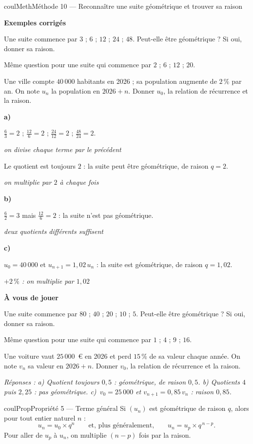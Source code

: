 \documentclass[11pt,a4paper]{article}
\makeatletter
\newcounter{lycee@signet}
\newcommand{\signet}[3][]{\stepcounter{lycee@signet}%
  \edef\lycee@dest{\if\relax\detokenize{#1}\relax
    signet.\arabic{lycee@signet}\else#1\fi}%
  \hypertarget{\lycee@dest}{}\bookmark[level=#2,dest=\lycee@dest]{#3}}
\newcommand{\res}[1]{#1}
\newcounter{methode}
\newenvironment{proprietebox}[1][Propriété]%
  {\begin{boitecours}[phantom={\signet{2}{#1}}]{coulProp}{#1}}{\end{boitecours}}
\newenvironment{methodebox}[1][Méthode]{\stepcounter{methode}%
  \begin{boitecours}[phantom={\signet[methode-\arabic{methode}]{2}{#1}}]{coulMeth}{#1}}%
  {\end{boitecours}}
\newcommand{\etape}[1]{\par\smallskip\textbf{\color{coulMeth}#1}\par\nobreak\smallskip}
\newcommand{\reponse}[1]{\par\smallskip
  {\footnotesize\itshape\color{black!55}Réponses : #1}}
\newcommand{\explique}[2]{\par\smallskip\noindent
  \begin{minipage}[t]{0.57\linewidth}\raggedright #1\end{minipage}\hfill
  \begin{minipage}[t]{0.40\linewidth}\raggedright\leavevmode
    {\small\itshape\color{black!60}#2}\end{minipage}\par}
\newcommand{\cas}[1]{\par\smallskip\noindent\textbf{\color{coulExo}#1}\vadjust{\nobreak}}
\newenvironment{correction}{\par}{\par}
\newcommand{\etapeexemples}{\etape{Exemples corrigés}}
\makeatother
\begin{document}
\begin{methodebox}[Méthode 10 --- Reconnaître une suite géométrique et trouver sa raison]
\etapeexemples
\begin{questions}[label=\alph*)]
  \item Une suite commence par $3$ ;\; $6$ ;\; $12$ ;\; $24$ ;\; $48$. Peut-elle être
        géométrique ? Si oui, donner sa raison.
  \item Même question pour une suite qui commence par $2$ ;\; $6$ ;\; $12$ ;\; $20$.
  \item Une ville compte $40\,000$ habitants en 2026 ; sa population augmente de
        $2\,\%$ par an. On note $u_{n}$ la population en $2026+n$. Donner $u_{0}$, la
        relation de récurrence et la raison.
\end{questions}
\begin{correction}
\cas{a)}
\explique{$\frac{6}{3}=2$ ;\; $\frac{12}{6}=2$ ;\; $\frac{24}{12}=2$ ;\;
$\frac{48}{24}=2$.}{on divise chaque terme par le précédent}
\explique{Le quotient est toujours $2$ : \res{la suite peut être géométrique}, de raison
$q=\res{2}$.}{on multiplie par $2$ à chaque fois}
\cas{b)}
\explique{$\frac{6}{2}=3$ mais $\frac{12}{6}=2$ : \res{la suite n'est pas
géométrique}.}{deux quotients différents suffisent}
\cas{c)}
\explique{$u_{0}=\res{40\,000}$ et $u_{n+1}=\res{1{,}02\,u_{n}}$ : la suite est géométrique, de
raison $q=\res{1{,}02}$.}{$+2\,\%$ : on multiplie par $1{,}02$}
\end{correction}

\etape{À vous de jouer}
\begin{questions}[label=\alph*)]
  \item Une suite commence par $80$ ;\; $40$ ;\; $20$ ;\; $10$ ;\; $5$. Peut-elle être
        géométrique ? Si oui, donner sa raison.
  \item Même question pour une suite qui commence par $1$ ;\; $4$ ;\; $9$ ;\; $16$.
  \item Une voiture vaut $25\,000$~€ en 2026 et perd $15\,\%$ de sa valeur chaque année.
        On note $v_{n}$ sa valeur en $2026+n$. Donner $v_{0}$, la relation de
        récurrence et la raison.
\end{questions}
\reponse{a) Quotient toujours $0{,}5$ : géométrique, de raison $0{,}5$.\; b) Quotients
$4$ puis $2{,}25$ : pas géométrique.\; c)~$v_{0}=25\,000$ et $v_{n+1}=0{,}85\,v_{n}$ :
raison $0{,}85$.}
\end{methodebox}

\begin{proprietebox}[Propriété 5 --- Terme général]
Si $(u_{n})$ est géométrique de raison $q$, alors pour tout entier naturel $n$ :
\[
  u_{n}=u_{0}\times q^{n}
  \qquad\text{et, plus généralement,}\qquad
  u_{n}=u_{p}\times q^{\,n-p} .
\]
Pour aller de $u_{p}$ à $u_{n}$, on multiplie $(n-p)$ fois par la raison.
\end{proprietebox}
\end{document}
